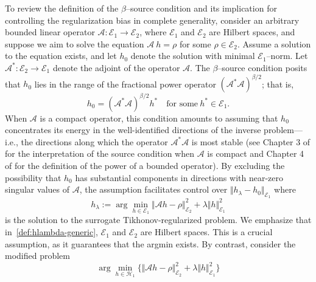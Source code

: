 \documentclass[twoside,11pt]{article}
\newcommand{\mc}{\mathcal}
\begin{document}
To review the definition of the $\beta$--source condition and its implication for controlling the regularization bias in complete generality, consider an arbitrary bounded linear operator 
$\mc{A} : \mc{E}_1 \rightarrow \mc{E}_2$,
where $\mc{E}_1$ and $\mc{E}_2$ are Hilbert spaces, and suppose we aim to solve the equation $\mc{A} \:h= \rho$
for some $\rho \in \mc{E}_2$. Assume a solution to the equation exists, and let $h_0$ denote the solution with minimal $\mc{E}_1$--norm. Let $\mc{A}^*:\mc{E}_2 \rightarrow \mc{E}_1$ denote the adjoint of the operator $\mc{A}$. The $\beta$--source condition posits that $h_0$ lies in the range of the fractional power operator $(\mc{A}^* \mc{A})^{\beta /2}$; that is, 
\begin{equation}
h_0= (\mc{A}^* \mc{A})^{\beta /2} h^{*} \quad \text{for some} \: h^{*} \in \mc{E}_1.
\label{def:betasource-generic}
\end{equation}
When $\mc{A}$ is a compact operator, this condition amounts to assuming that $h_{0}$ concentrates its energy in the well-identified directions of the inverse problem—i.e., the directions along which the operator $\mathcal{A}^* \mathcal{A}$ is most stable (see Chapter 3 of \cite{carrasco2007linear} for the interpretation of the source condition when $\mc{A}$ is compact and Chapter 4 of \cite{hohage2002lecture} for the definition of the power of a bounded operator).
By excluding the possibility that $h_0$ has substantial components in directions with near-zero singular values of $\mathcal{A}$, the assumption facilitates control over $\Vert h_\lambda - h_0 \Vert_{\mc{E}_1}$ where 
\begin{equation}
    h_\lambda := \arg \min_{h \in \mc{E}_1} \Vert \mc{A} h - \rho \Vert_{\mc{E}_2}^2 + \lambda \Vert h \Vert_{\mc{E}_1}^2
\label{def:hlambda-generic}
\end{equation} 
is the solution to the surrogate Tikhonov-regularized problem. We emphasize that in~\eqref{def:hlambda-generic}, $\mc{E}_1$ and $\mc{E}_2$ are Hilbert spaces. This is a crucial assumption, as it guarantees that the argmin exists. By contrast, consider the modified problem
\begin{equation*}
\arg \min_{h \in \mc{H}_1} \big\{ \Vert \mc{A} h - \rho \Vert_{\mc{E}_2}^2 + \lambda \Vert h \Vert_{\mc{E}_1}^2 \big\}
\end{equation*}
\end{document}
